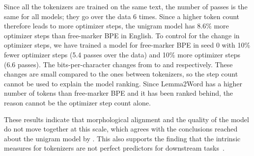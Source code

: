 Since all the tokenizers are trained on the same text, the number of passes is the same for all models; they go over the data 6 times.
Since a higher token count therefore leads to more optimizer steps, the unigram model has 8.6\% more optimizer steps than free-marker BPE in English.
To control for the change in optimizer steps, we have trained a model for free-marker BPE in seed 0 with 10\% fewer optimizer steps (5.4 passes over the data) and 10\% more optimizer steps (6.6 passes).
The bits-per-character changes from \nBpcControlBase{} to \nBpcControlLow{} and \nBpcControlHigh{} respectively.
These changes are small compared to the ones between tokenizers, so the step count cannot be used to explain the model ranking.
Since Lemma2Word has a higher number of tokens than free-marker BPE and it has been ranked behind, the reason cannot be the optimizer step count alone.

These results indicate that morphological alignment and the quality of the model do not move together at this scale, which agrees with the conclusions reached about the unigram model by \citet{bostrom2020bpe}.
This also supports the finding that the intrinsic measures for tokenizers are not perfect predictors for downstream tasks~\cite{ali2024tokenizer,schmidt2024tokenization}.
